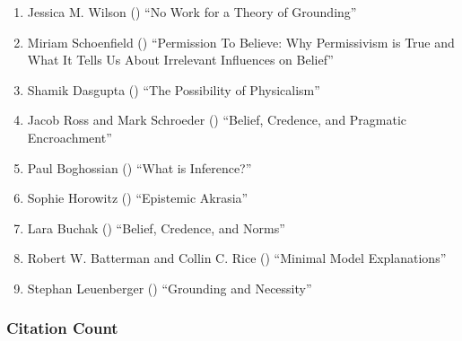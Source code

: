 \documentclass[
  10pt,
  letterpaper,
  DIV=11,
  numbers=noendperiod,
  twoside]{scrartcl}
\providecommand{\tightlist}{%
  \setlength{\itemsep}{0pt}\setlength{\parskip}{0pt}}\usepackage{longtable,booktabs,array}
\begin{document}
\begin{enumerate}
\def\labelenumi{\arabic{enumi}.}
\tightlist
\item
  Jessica M. Wilson () ``No Work
  for a Theory of Grounding''
\item
  Miriam Schoenfield ()
  ``Permission To Believe: Why Permissivism is True and What It Tells Us
  About Irrelevant Influences on Belief''
\item
  Shamik Dasgupta () ``The
  Possibility of Physicalism''
\item
  Jacob Ross and Mark Schroeder
  () ``Belief, Credence, and
  Pragmatic Encroachment''
\item
  Paul Boghossian () ``What is
  Inference?''
\item
  Sophie Horowitz () ``Epistemic
  Akrasia''
\item
  Lara Buchak () ``Belief,
  Credence, and Norms''
\item
  Robert W. Batterman and Collin C. Rice
  () ``Minimal Model
  Explanations''
\item
  Stephan Leuenberger ()
  ``Grounding and Necessity''
\end{enumerate}

\subsubsection*{Citation Count}\label{sec-count-2014}
\end{document}
